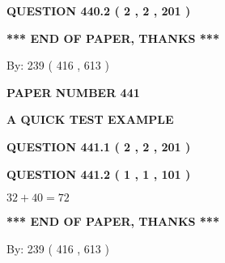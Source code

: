 \documentclass[12pt]{article}
\begin{document}
{\textbf{\Large{QUESTION
440.2 
 ( 2 , 2 , 201 )
}}}
  
  
   
   
 \vspace{0.2in}
 
   
   
   
   
\vspace{1.0in} 
{\textbf{\large{ *** END OF PAPER, THANKS *** }}} 
   
   
\hspace{1.0in} By: 
 239 ( 416 ,  613 )
   
   
   
   
\newpage 
\setcounter{page}{ 
   441001 } 
   
   
   
   
 {\textbf{ \Large{ PAPER NUMBER  441  }}}
   
   
\vspace{0.2in}
   
   
   
   
   
   
 \vspace{0.2in}
{\LARGE {\textbf{ A QUICK TEST EXAMPLE}}}
   
   
  
\vspace{0.2in}
  
{\textbf{\Large{QUESTION
441.1 
 ( 2 , 2 , 201 )
}}}
  
  
  
\vspace{0.2in}
  
{\textbf{\Large{QUESTION
441.2 
 ( 1 , 1 , 101 )
}}}
  
  
 
 

$ %
32 +  %
40=   %
72$
 
 
   
   
 \vspace{0.2in}
 
   
   
   
   
\vspace{1.0in} 
{\textbf{\large{ *** END OF PAPER, THANKS *** }}} 
   
   
\hspace{1.0in} By: 
 239 ( 416 ,  613 )
   
   
   
   
\newpage 
\setcounter{page}{ 
   442001 } 
   
\end{document}
